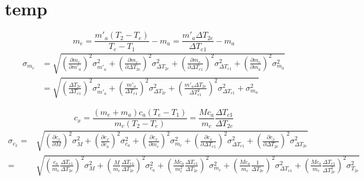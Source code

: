\documentclass{article}
\begin{document}
	\newpage
	\section{temp}
	\[ 
	m_{e} = \frac{m'_{a}\left(T_{2} - T_{e}\right)}{T_{e} - T_{1}} - m_{a} =  \frac{m'_{a}\Delta T_{2e}}{\Delta T_{e1}} - m_{a}
	\]
	\begin{align*}
		\sigma_{m_e} &= \sqrt{\left(\frac{\partial m_{e}}{\partial m'_{a}}\right)^2\sigma_{m'_{a}}^2 + \left(\frac{\partial m_{e}}{\partial\Delta T_{2e}}\right)^2\sigma_{\Delta T_{2e}}^2 + \left(\frac{\partial m_{e}}{\partial\Delta T_{e1}}\right)^2\sigma_{\Delta T_{e1}}^2 + \left(\frac{\partial m_{e}}{\partial m_{a}}\right)^2\sigma^2_{m_{a}}} \\
					 &= \sqrt{\left(\frac{\Delta T_{2e}}{\Delta T_{e1}}\right)^2\sigma_{m'_{a}}^2 + \left(\frac{m'_{a}}{\Delta T_{e1}}\right)^2\sigma^2_{\Delta T_{2e}} + \left(\frac{m'_{a}\Delta T_{2e}}{\Delta T_{e1}^2}\right)^2\sigma^2_{\Delta T_{e1}}+\sigma^2_{m_{a}}}
	\end{align*}
	\vspace{5cm}
	
	\[ 
	c_{x} = \frac{(m_{e} + m_{a})c_{a}(T_{e} - T_{1})}{m_{c}(T_{2}-T_{e})} = \frac{Mc_{a}}{m_{c}}\frac{\Delta T_{e1}}{\Delta T_{2e}}
	\]
	\begin{align*}
		\sigma_{c_{x}} =&  \sqrt{\left(\frac{\partial c_{x}}{\partial M}\right)^2\sigma_{M}^2 + \left(\frac{\partial c_{x}}{\partial c_{a}}\right)^2\sigma_{c_{a}}^2 + \left(\frac{\partial c_{x}}{\partial m_{c}}\right)^2\sigma_{m_{c}}^2+ \left(\frac{\partial c_{x}}{\partial\Delta T_{e1}}\right)^2\sigma_{\Delta T_{e1}}^2 + \left(\frac{\partial c_{x}}{\partial \Delta T_{2e}}\right)^2\sigma^2_{\Delta T_{2e}}} \\
		 =& \sqrt{\left(\frac{c_{a}}{m_{c}}\frac{\Delta T_{e1}}{\Delta T_{2e}}\right)^2\sigma^2_{M} + \left( \frac{M}{m_{c}}\frac{\Delta T_{e1}}{\Delta T_{2e}} \right)^2\sigma_{c_{a}}^2 + \left(\frac{Mc_{a}}{m_{c}^2}\frac{\Delta T_{e1}}{\Delta T_{2e}}\right)^2 \sigma_{m_{c}}^2 + \left(\frac{Mc_{a}}{m_{c}}\frac{1}{\Delta T_{2e}}\right)^2\sigma_{\Delta T_{e1}}^2 + \left(\frac{Mc_{a}}{m_{c}}\frac{\Delta T_{e1}}{\Delta T_{2e}^2}\right)^2\sigma_{T_{2e}}^2}
	\end{align*}
	
	
\end{document}
